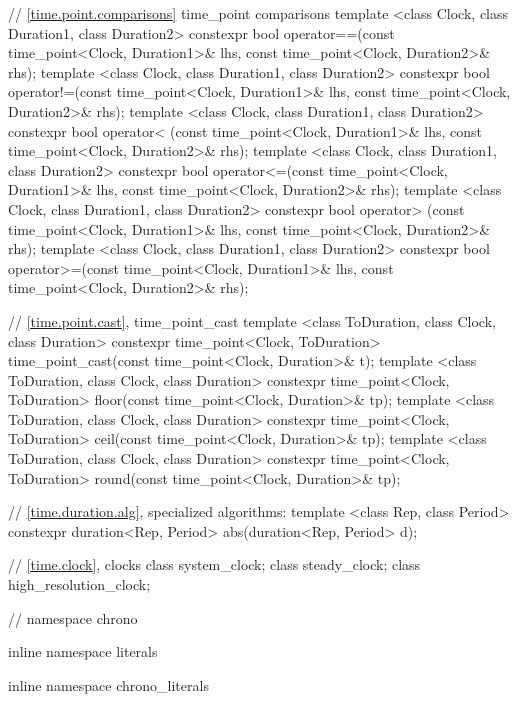 \begin{codeblock}
{{// \ref{time.point.comparisons} time_point comparisons
template <class Clock, class Duration1, class Duration2>
   constexpr bool operator==(const time_point<Clock, Duration1>& lhs,
                             const time_point<Clock, Duration2>& rhs);
template <class Clock, class Duration1, class Duration2>
   constexpr bool operator!=(const time_point<Clock, Duration1>& lhs,
                             const time_point<Clock, Duration2>& rhs);
template <class Clock, class Duration1, class Duration2>
   constexpr bool operator< (const time_point<Clock, Duration1>& lhs,
                             const time_point<Clock, Duration2>& rhs);
template <class Clock, class Duration1, class Duration2>
   constexpr bool operator<=(const time_point<Clock, Duration1>& lhs,
                             const time_point<Clock, Duration2>& rhs);
template <class Clock, class Duration1, class Duration2>
   constexpr bool operator> (const time_point<Clock, Duration1>& lhs,
                             const time_point<Clock, Duration2>& rhs);
template <class Clock, class Duration1, class Duration2>
   constexpr bool operator>=(const time_point<Clock, Duration1>& lhs,
                             const time_point<Clock, Duration2>& rhs);

// \ref{time.point.cast}, time_point_cast
template <class ToDuration, class Clock, class Duration>
  constexpr time_point<Clock, ToDuration>
  time_point_cast(const time_point<Clock, Duration>& t);
template <class ToDuration, class Clock, class Duration>
  constexpr time_point<Clock, ToDuration>
  floor(const time_point<Clock, Duration>& tp);
template <class ToDuration, class Clock, class Duration>
  constexpr time_point<Clock, ToDuration>
  ceil(const time_point<Clock, Duration>& tp);
template <class ToDuration, class Clock, class Duration>
  constexpr time_point<Clock, ToDuration>
  round(const time_point<Clock, Duration>& tp);

// \ref{time.duration.alg}, specialized algorithms:
template <class Rep, class Period>
  constexpr duration<Rep, Period> abs(duration<Rep, Period> d);

// \ref{time.clock}, clocks
class system_clock;
class steady_clock;
class high_resolution_clock;

}  // namespace chrono

inline namespace literals {
inline namespace chrono_literals {

}}}
\end{codeblock}
